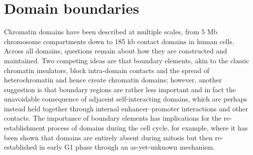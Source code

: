 \documentclass[a4paper,11pt,oneside]{book}
\begin{document}



\section{Domain boundaries}


Chromatin domains have been described at multiple scales, from 5 Mb chromosome compartments\cite{Lieberman2009} down to 185 kb contact domains\cite{Rao2014} in human cells. Across all domains, questions remain about how they are constructed and maintained. Two competing ideas are that boundary elements, akin to the classic chromatin insulators, block intra-domain contacts and the spread of heterochromatin and hence create chromatin domains; however, another suggestion is that boundary regions are rather less important and in fact the unavoidable consequence of adjacent self-interacting domains, which are perhaps instead held together through internal enhancer--promoter interactions and other contacts. The importance of boundary elements has implications for the re-establishment process of domains during the cell cycle, for example, where it has been shown that domains are entirely absent during mitosis but then re-established in early G1 phase through an as-yet-unknown mechanism.\cite{Naumova2013} 
\end{document}
